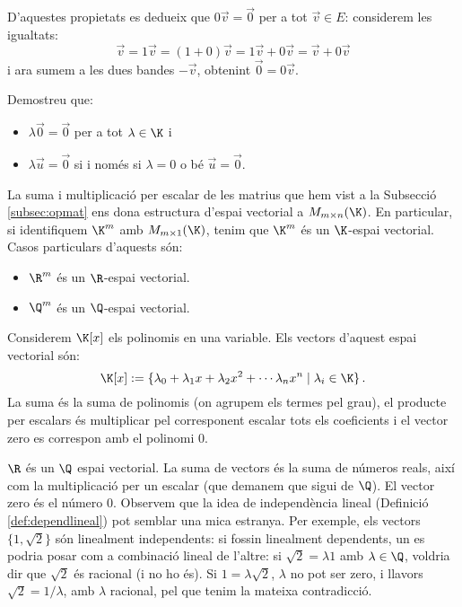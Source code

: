 \begin{observacio}
	D'aquestes propietats es dedueix que $0\vec v=\vec 0$ per a tot $\vec v \in E$: considerem les igualtats:
	$$
	\vec v = 1\vec v = (1+0)\vec v=1\vec v+0\vec v=\vec v+0\vec v
	$$
	i ara sumem a les dues bandes $-\vec v$, obtenint $\vec 0 = 0\vec v$.
\end{observacio}
\begin{exercici}
	Demostreu que:
	\begin{itemize}
		\item $\lambda \vec 0=\vec 0$ per a tot $\lambda\in\K$ i
		\item $\lambda \vec u=\vec 0$ si i només si $\lambda=0$ o bé $\vec u=\vec 0$.
	\end{itemize}
\end{exercici}
\begin{exemple}
	La suma i multiplicació per escalar de les matrius que hem vist a la Subsecció \ref{subsec:opmat} ens dona estructura d'espai vectorial a $M_{m\times n}(\K)$. En particular, si identifiquem $\K^m$ amb $M_{m\times 1}(\K)$, tenim que $\K^m$ és un $\K$-espai vectorial. Casos particulars d'aquests són:
	\begin{itemize}
		\item $\R^m$ és un $\R$-espai vectorial.
		\item $\Q^m$ és un $\Q$-espai vectorial.
	\end{itemize}
\end{exemple}
\begin{exemple}
	Considerem $\K[x]$ els polinomis en una variable. Els vectors d'aquest espai vectorial són:
	$$
	\K[x]:=\{ \lambda_0 + \lambda_1 x + \lambda_2 x^2+ \cdots \lambda_n x^n  \mid \lambda_i \in \K \} \,.
	$$
	La suma és la suma de polinomis (on agrupem els termes pel grau), el producte per escalars és multiplicar pel corresponent escalar tots els coeficients i el vector zero es correspon amb el polinomi $0$.
\end{exemple}
\begin{exemple}
	$\R$ és un $\Q$ espai vectorial. La suma de vectors és la suma de números reals, així com la multiplicació per un escalar (que demanem que sigui de $\Q$). El vector zero és el número $0$. Observem que la idea de independència lineal (Definició \ref{def:dependlineal}) pot semblar una mica estranya. Per exemple, els vectors $\{1,\sqrt{2}\}$ són linealment independents: si fossin linealment dependents, un es podria posar com a combinació lineal de l'altre: si $\sqrt{2}=\lambda 1$ amb $\lambda\in\Q$, voldria dir que $\sqrt{2}$ és racional (i no ho és). Si $1=\lambda \sqrt{2}$, $\lambda$ no pot ser zero, i llavors $\sqrt{2}=1/\lambda$, amb $\lambda$ racional, pel que tenim la mateixa contradicció.
\end{exemple}